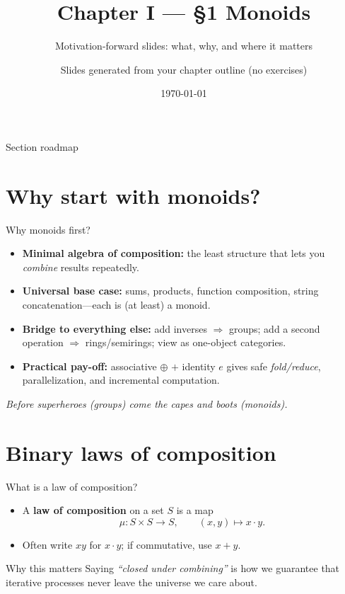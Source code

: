 \documentclass[aspectratio=169,11pt]{beamer}
\title{Chapter I — \S1 Monoids}
\subtitle{Motivation-forward slides: what, why, and where it matters}
\author{Slides generated from your chapter outline (no exercises)}
\date{\today}
\newcommand{\tline}[1]{\par\medskip\textcolor{transit}{\emph{#1}}\par\medskip}
\begin{document}
\maketitle

\begin{frame}{Section roadmap}
\tableofcontents
\end{frame}

\section{Why start with monoids?}
\begin{frame}{Why monoids first?}
\begin{itemize}
  \item \textbf{Minimal algebra of composition:} the least structure that lets you \emph{combine} results repeatedly.
  \item \textbf{Universal base case:} sums, products, function composition, string concatenation—each is (at least) a monoid.
  \item \textbf{Bridge to everything else:} add inverses $\Rightarrow$ groups; add a second operation $\Rightarrow$ rings/semirings; view as one-object categories.
  \item \textbf{Practical pay-off:} associative $\oplus$ $+$ identity $e$ gives safe \emph{fold/reduce}, parallelization, and incremental computation.
\end{itemize}
\tline{Before superheroes (groups) come the capes and boots (monoids).}
\end{frame}

\section{Binary laws of composition}
\begin{frame}{What is a law of composition?}
\begin{itemize}
  \item A \textbf{law of composition} on a set $S$ is a map
  \[
    \mu : S\times S \to S,\qquad (x,y)\mapsto x\cdot y.
  \]
  \item Often write $xy$ for $x\cdot y$; if commutative, use $x+y$.
\end{itemize}
\begin{alertblock}{Why this matters}
Saying \emph{“closed under combining”} is how we guarantee that iterative processes never leave the universe we care about.
\end{alertblock}
\end{frame}
\end{document}
